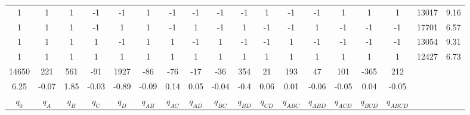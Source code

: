 \documentclass[11pt]{article}
\begin{document}
\begin{landscape}
\begin{table}[]
\begin{tabular}{|cccccccccccccccc|cc|}
		1 & 1 & 1 & -1 & -1 & 1 & -1 & -1 & -1 & -1 & 1 & -1 & -1 & 1 & 1 & 1 & 13017 & 9.16 \\
		1 & 1 & 1 & -1 & 1 & 1 & -1 & 1 & -1 & 1 & -1 & -1 & 1 & -1 & -1 & -1 & 17701 & 6.57 \\
		1 & 1 & 1 & 1 & -1 & 1 & 1 & -1 & 1 & -1 & -1 & 1 & -1 & -1 & -1 & -1 & 13054 & 9.31 \\
		1 & 1 & 1 & 1 & 1 & 1 & 1 & 1 & 1 & 1 & 1 & 1 & 1 & 1 & 1 & 1 & 12427 & 6.73 \\ \hline
		14650 & 221 & 561 & -91 & 1927 & -86 & -76 & -17 & -36 & 354 & 21 & 193 & 47 & 101 & -365 & 212 \\
		6.25 & -0.07 & 1.85 & -0.03 & -0.89 & -0.09 & 0.14 & 0.05 & -0.04 & -0.4 & 0.06 & 0.01 & -0.06 & -0.05 & 0.04 & -0.05 \\ \hline
		$q_{0}$ & $q_{A}$ & $q_{B}$ & $q_{C}$ & $q_{D}$ & $q_{AB}$ & $q_{AC}$ & $q_{AD}$ & $q_{BC}$ & $q_{BD}$ & $q_{CD}$ & $q_{ABC}$ & $q_{ABD}$ & $q_{ACD}$ & $q_{BCD}$ & $q_{ABCD}$ & 
	\end{tabular}
\end{table}
\end{landscape}
\end{document}
